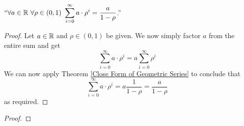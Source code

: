         \begin{corollary}
            $``\forall a \in \mathbb{R} \ \forall \rho \in (0, 1) \
            \displaystyle\sum_{i = 0}^{\infty} a \cdot \rho^i = \dfrac{a}{1 - \rho}$.''
        \end{corollary}
        \begin{proof}
            Let $a \in \mathbb{R}$ and $\rho \in (0, 1)$ be given. We now simply factor
            $a$ from the entire sum and get
            \[
                \sum_{i = 0}^{\infty} a \cdot \rho^i = a \sum_{i = 0}^{\infty} \rho^i
            \]
            We can now apply Theorem \ref{Close Form of Geometric Series} to conclude
            that
            \[
                \sum_{i = 0}^{\infty} a \cdot \rho^i = a \frac{1}{1 - \rho} = \frac{a}{1 - \rho}
            \]
            as required. \QED
        \end{proof}
        \begin{theorem}
        \end{theorem}
        \begin{proof}
        \end{proof}

